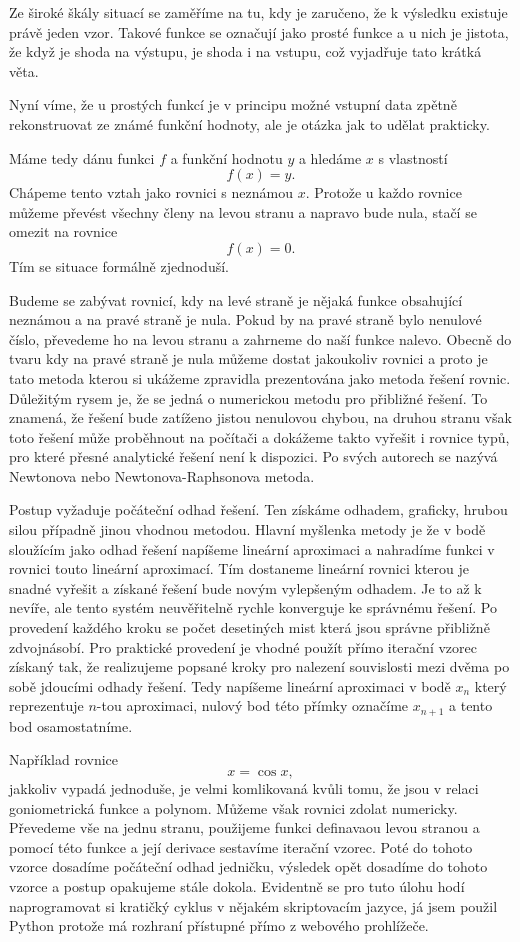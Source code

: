 \documentclass[12pt]{article}
\begin{document}
Ze široké škály situací se zaměříme na tu, kdy je zaručeno, že k výsledku existuje právě jeden vzor. Takové funkce se označují jako prosté funkce a u nich je jistota, že když je shoda na výstupu, je shoda i na vstupu, což vyjadřuje tato krátká věta.

Nyní víme, že u prostých funkcí je v principu možné vstupní data zpětně rekonstruovat ze známé funkční hodnoty, ale je otázka jak to udělat prakticky.

Máme tedy dánu funkci $f$ a funkční hodnotu $y$ a hledáme $x$ s vlastností $$f(x)=y.$$ Chápeme tento vztah jako rovnici s neznámou $x$. Protože u každo rovnice můžeme převést všechny členy na levou stranu a napravo bude nula, stačí se omezit na rovnice $$f(x)=0.$$ Tím se situace formálně zjednoduší.

Budeme se zabývat rovnicí, kdy na levé straně je nějaká funkce obsahující neznámou a na pravé straně je nula. Pokud by na pravé straně bylo nenulové číslo, převedeme ho na levou stranu a zahrneme do naší funkce nalevo. Obecně do tvaru kdy na pravé straně je nula můžeme dostat jakoukoliv rovnici a proto je tato metoda kterou si ukážeme zpravidla prezentována jako metoda řešení rovnic. Důležitým rysem je, že se jedná o numerickou metodu pro přibližné řešení. To znamená, že řešení bude zatíženo jistou nenulovou chybou, na druhou stranu však toto řešení může proběhnout na počítači a dokážeme takto vyřešit i rovnice typů, pro které přesné analytické řešení není k dispozici. Po svých autorech se nazývá Newtonova nebo Newtonova-Raphsonova metoda.

Postup vyžaduje počáteční odhad řešení. Ten získáme odhadem, graficky, hrubou silou případně jinou vhodnou metodou. Hlavní myšlenka metody je že v bodě sloužícím jako odhad řešení napíšeme lineární aproximaci a nahradíme funkci v rovnici touto lineární aproximací. Tím dostaneme lineární rovnici kterou je snadné vyřešit a získané řešení bude novým vylepšeným odhadem. Je to až k nevíře, ale tento systém neuvěřitelně rychle konverguje ke správnému řešení. Po provedení každého kroku se počet desetiných mist která jsou správne přibližně zdvojnásobí. Pro praktické provedení je vhodné použít přímo iterační vzorec získaný tak, že realizujeme popsané kroky pro nalezení souvislosti mezi dvěma po sobě jdoucími odhady řešení. Tedy napíšeme lineární aproximaci v bodě $x_n$ který reprezentuje $n$-tou aproximaci, nulový bod této přímky označíme $x_{n+1}$ a tento bod osamostatníme.

Například rovnice $$x=\cos x,$$ jakkoliv vypadá jednoduše, je velmi komlikovaná kvůli tomu, že jsou v relaci goniometrická funkce a polynom. Můžeme však rovnici zdolat numericky. Převedeme vše na jednu stranu, použijeme funkci definavaou levou stranou a pomocí této funkce a její derivace sestavíme iterační vzorec. Poté do tohoto vzorce dosadíme počáteční odhad jedničku, výsledek opět dosadíme do tohoto vzorce a postup opakujeme stále dokola. Evidentně se pro tuto úlohu hodí naprogramovat si kratičký cyklus v nějakém skriptovacím jazyce, já jsem použil Python protože má rozhraní přístupné přímo z webového prohlížeče.
\end{document}
